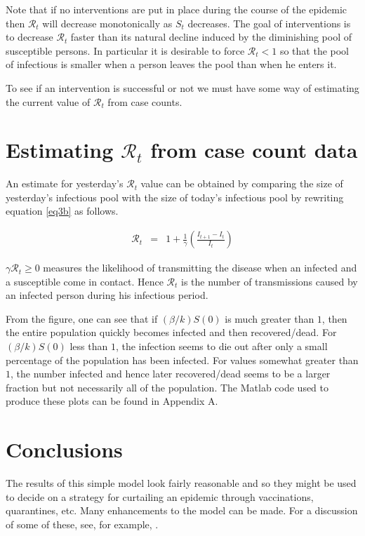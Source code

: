 \documentclass[11pt]{article}
\begin{document}
Note that if no interventions are put in place during the course of the epidemic 
then $\mathcal{R}_t$ will decrease monotonically as $S_t$ decreases.
The goal of interventions is to decrease $\mathcal{R}_t$ faster than
its natural decline induced by the diminishing pool of susceptible persons.
In particular it is desirable to force $\mathcal{R}_t < 1$ so that 
the pool of infectious is smaller when a person leaves the pool
than when he enters it. 

To see if an intervention is successful or not we must have some
way of estimating the current value of $\mathcal{R}_t$ from 
case counts.

\section{Estimating $\mathcal{R}_t$ from case count data}

An estimate for yesterday's $\mathcal{R}_t$ value can be obtained
by comparing the size of yesterday's infectious pool with the size
of today's infectious pool by rewriting equation \ref{eq3b} as follows.

\begin{eqnarray}
\mathcal{R}_t  & =  & 1 + \frac{1}{\gamma}  \left( \frac{ I_{t+1} - I_t} {I_t }  \right) \label{eq4b} 
\end{eqnarray}

$\gamma \mathcal{R}_t \geq 0$ measures the likelihood
of transmitting the disease when an infected and a susceptible come
in contact.   Hence $\mathcal{R}_t$ is the number of transmissions
caused by an infected person during his infectious period.

From the figure, one can see that if $( \beta / k ) S(0)$ is much greater than $1$,
then the entire population quickly becomes infected and then recovered/dead.
For $( \beta / k ) S(0)$ less than $1$, the infection seems to die out after
only a small percentage of the population has been infected.  For values
somewhat greater than $1$, the number infected and hence later recovered/dead
seems to be a larger fraction but not necessarily all of the population.
The Matlab code used to produce these plots can be found in Appendix A.

\section{Conclusions}
The results of this simple model look fairly reasonable and so they might be
used to decide on a strategy for curtailing an epidemic through vaccinations,
quarantines, etc.  Many enhancements to the model can be made.  For a discussion 
of some of these, see, for example, \cite{Wikipedia}.  
\end{document}

